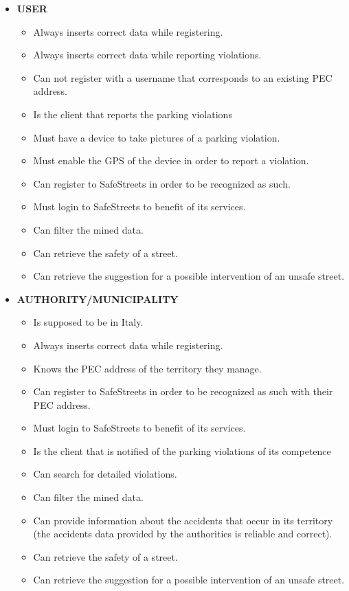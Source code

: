 	\begin{itemize}
		\item \textbf{USER}
			\begin{itemize}
				\item Always inserts correct data while registering.
				\item Always inserts correct data while reporting violations.
				\item Can not register with a username that corresponds to an existing PEC address.
				\item Is the client that reports the parking violations
				\item Must have a device to take pictures of a parking violation.
				\item Must enable the GPS of the device in order to report a violation.
				\item Can register to SafeStreets in order to be recognized as such.
				\item Must login to SafeStreets to benefit of its services.
				\item Can filter the mined data.
				\item Can retrieve the safety of a street.
				\item Can retrieve the suggestion for a possible intervention of an unsafe street.
			\end{itemize}
		\item \textbf{AUTHORITY/MUNICIPALITY}
			\begin{itemize}
				\item Is supposed to be in Italy.
				\item Always inserts correct data while registering.
				\item Knows the PEC address of the territory they manage.
				\item Can register to SafeStreets in order to be recognized as such with their PEC address.
				\item Must login to SafeStreets to benefit of its services.
				\item Is the client that is notified of the parking violations of its competence
				\item Can search for detailed violations.
				\item Can filter the mined data.
				\item Can provide information about the accidents that occur in its territory (the accidents data provided by the authorities is reliable and correct).
				\item Can retrieve the safety of a street.
				\item Can retrieve the suggestion for a possible intervention of an unsafe street.
			\end{itemize}
	\end{itemize}
	
